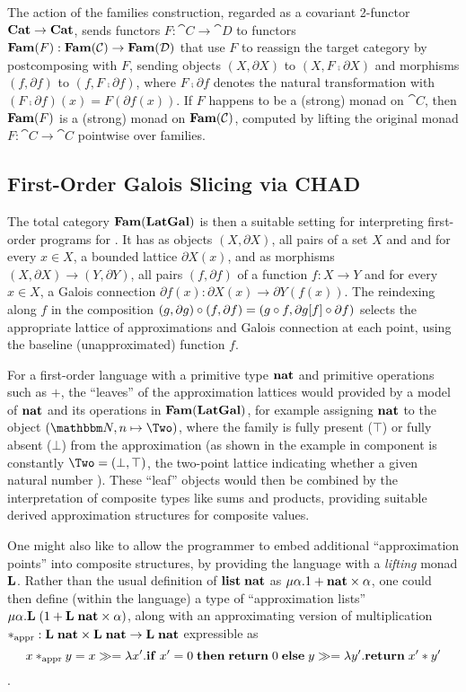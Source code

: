 The action of the families construction, regarded as a covariant 2-functor $\mathbf{Cat} \to \mathbf{Cat}$, sends functors $F:
\cat{C} \to \cat{D}$ to functors $\mathbf{Fam}(F): \mathbf{Fam}(\mathcal{C}) \to \mathbf{Fam}(\mathcal{D})$ that use $F$ to reassign the
target category by postcomposing with $F$, sending objects $(X, \partial X)$ to $(X, F \comp \partial X)$ and
morphisms $(f, \partial f)$ to $(f, F \comp \partial f)$, where $F \comp \partial f$ denotes the natural
transformation with $(F \comp \partial f)(x) = F(\partial f(x))$. If $F$ happens to be a (strong) monad on
$\cat{C}$, then $\mathbf{Fam}(F)$ is a (strong) monad on $\mathbf{Fam}(\mathcal{C})$, computed by lifting the original monad $F:
\cat{C} \to \cat{C}$ pointwise over families.

\subsection{First-Order Galois Slicing via CHAD}
\label{sec:fam:galois-slicing}

The total category $\mathbf{Fam}(\mathbf{LatGal})$ is then a suitable setting for interpreting first-order programs for \GPS.
It has as objects $(X, \partial X)$, all pairs of a set $X$ and and for every $x \in X$, a bounded lattice
$\partial X(x)$, and as morphisms $(X, \partial X) \to (Y, \partial Y)$, all pairs $(f, \partial f)$ of a
function $f: X \to Y$ and for every $x \in X$, a Galois connection $\partial f(x): \partial X(x) \to \partial
Y(f(x))$. The reindexing along $f$ in the composition $(g, \partial g) \circ (f, \partial f) = (g \circ f,
\partial g[f] \circ \partial f)$ selects the appropriate lattice of approximations and Galois
connection at each point, using the baseline (unapproximated) function $f$.

For a first-order language with a primitive type $\mathbf{nat}$ and primitive operations such as $+$, the
``leaves'' of the approximation lattices would provided by a model of $\mathbf{nat}$ and its operations in
$\mathbf{Fam}(\mathbf{LatGal})$, for example assigning $\mathbf{nat}$ to the object $(\Nat,n \mapsto \Two)$, where the family is
fully present ($\top$) or fully absent ($\bot$) from the approximation (as shown in the example in component
is constantly $\Two = (\bot,\top)$, the two-point lattice indicating whether a given natural number
). These ``leaf'' objects would then be combined by the interpretation of composite types
like sums and products, providing suitable derived approximation structures for composite values.

One might also like to allow the programmer to embed additional ``approximation points'' into composite
structures, by providing the language with a \emph{lifting} monad $\mathbf{L}$. Rather than the usual definition
of $\mathbf{list}\;\mathbf{nat}$ as $\mu\alpha.1 + \mathbf{nat} \times \alpha$, one could then define (within the
language) a type of ``approximation lists'' $\mu\alpha.\mathbf{L}\;(1 + \mathbf{L}\;\mathbf{nat} \times \alpha)$, along
with an approximating version of multiplication $*_{\text{appr}}: \mathbf{L}\;\mathbf{nat} \times \mathbf{L}\;\mathbf{nat}
\to \mathbf{L}\;\mathbf{nat}$ expressible as
\[x *_{\text{appr}} y = {x}\gg={\lambda x'.\mathbf{if}\;x' =
0\;\mathbf{then}\;\mathbf{return}\;0\;\mathbf{else}\;{y}\gg={\lambda y'.\mathbf{return}\;x' * y'}}\].

